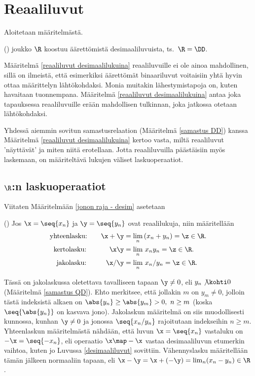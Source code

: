 \section{Reaaliluvut} \label{reaaliluvut}
\alku

Aloitetaan määritelmästä.
\begin{Def} \label{reaaliluvut desimaalilukuina} 
()  joukko $\R$ koostuu äärettömistä desimaaliluvuista,
ts.\ $\R=\DD$.
\end{Def}
Määritelmä \ref{reaaliluvut desimaalilukuina} reaaliluvuille ei ole ainoa mahdollinen, sillä on
ilmeistä, että esimerkiksi äärettömät binaariluvut voitaisiin yhtä hyvin ottaa määrittelyn
lähtökohdaksi. Monia muitakin lähestymistapoja on, kuten havaitaan tuonnempana. Määritelmä 
\ref{reaaliluvut desimaalilukuina} antaa joka tapauksessa reaaliluvuille erään mahdollisen 
tulkinnan, joka jatkossa otetaan lähtökohdaksi. 

Yhdessä aiemmin sovitun samastusrelaation (Määritelmä \ref{samastus DD}) kanssa Määritelmä 
\ref{reaaliluvut desimaalilukuina} kertoo vasta, miltä reaaliluvut 'näyttävät' ja miten niitä 
erotellaan. Jotta reaaliluvuilla päästäisiin myös laskemaan, on määriteltävä lukujen väliset
laskuoperaatiot. 

\subsection*{$\R$:n laskuoperaatiot}

Viitaten Määritelmään \ref{jonon raja - desim} asetetaan
\begin{Def} \label{reaalilukujen laskutoimitukset}
() Jos $\x = \seq{x_n}$ ja $\y = \seq{y_n}$ ovat
reaalilukuja, niin määritellään
\begin{align*}
\text{yhteenlasku:} \quad\quad       \x+\y &= \lim_n\,(x_n+y_n) = \z\in\R. \\
\text{kertolasku:} \ \quad\quad\quad  \x\y &= \lim_n\,x_n y_n = \z\in\R.\\
\text{jakolasku:} \,\ \ \quad\quad   \x/\y &= \lim_n\,x_n / y_n = \z\in\R.
\end{align*} \end{Def}
Tässä on jakolaskussa oletettava tavalliseen tapaan $\y \neq 0$, eli $y_n \not\kohti 0$
(Määritelmä \ref{samastus QD}). Ehto merkitsee, että jollakin $m$ on  $y_m \neq 0$, jolloin
tästä indeksistä alkaen on $\abs{y_n} \ge \abs{y_m} > 0,\ n \ge m$ (koska $\seq{\abs{y_n}}$ on
kasvava jono). Jakolaskun määritelmä on siis muodollisesti kunnossa, kunhan $\y \neq 0$ ja
jonossa $\seq{x_n/y_n}$ rajoitutaan indekseihin $n \ge m$. Yhteenlaskun määritelmästä nähdään,
että luvun $\x = \seq{x_n}$ vastaluku on $-\x = \seq{-x_n}$, eli operaatio $\x \map -\x$ vastaa
desimaaliluvun etumerkin vaihtoa, kuten jo Luvussa \ref{desimaaliluvut} sovittiin. Vähennyslasku
määritellään tämän jälkeen normaaliin tapaan, eli $\x-\y=\x+(-\y)=\lim_n(x_n-y_n)\in\R$.

